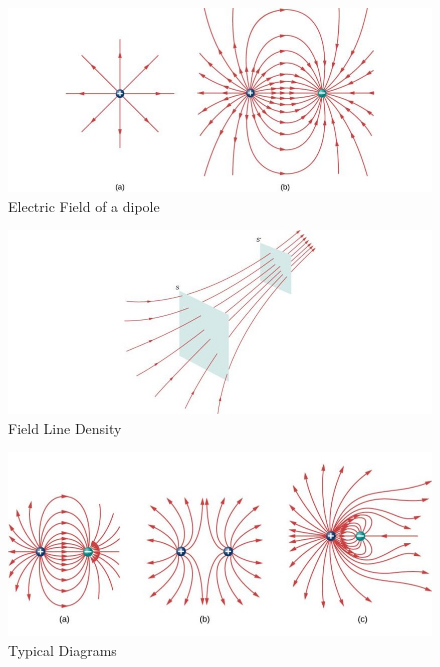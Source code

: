 \documentclass[14pt]{memoir}
\begin{document}
\begin{figure}[h]
\begin{center}
\includegraphics[scale=0.60]{fig/fig_05_29.jpg}
\caption{Electric Field of a dipole}
\label{fig:05_29}
\end{center}
\end{figure}

\begin{figure}[h]
\begin{center}
\includegraphics[scale=0.60]{fig/fig_05_30.jpg}
\caption{Field Line Density}
\label{fig:05_30}
\end{center}
\end{figure}

\begin{figure}[h]
\begin{center}
\includegraphics[scale=0.60]{fig/fig_05_31.jpg}
\caption{Typical Diagrams}
\label{fig:05_31}
\end{center}
\end{figure}
\end{document}
